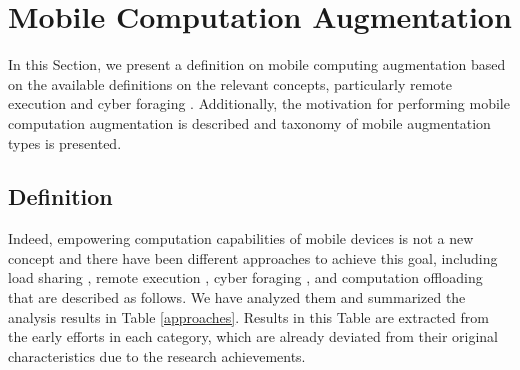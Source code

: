 \documentclass[publish]{IEEEtran}
\begin{document}
\section{Mobile Computation Augmentation} \label{mobileaugmentation}
In this Section, we present a definition on mobile computing augmentation based on the available definitions on the relevant concepts, particularly remote execution \cite{Rudenko1998a} and cyber foraging \cite{Satyanarayanan2001}. Additionally, the motivation for performing mobile computation augmentation is described and taxonomy of mobile augmentation types is presented.

\subsection{Definition} \label{definition}
Indeed, empowering computation capabilities of mobile devices is not a new concept and there have been different approaches to achieve this goal, including load sharing \cite{Othman:1998:PCS:584007.584011}, remote execution \cite{Rudenko1998a}, cyber foraging \cite{Satyanarayanan2001}, and computation offloading \cite{Li2001, Li2002} that are described as follows. {We have analyzed them and summarized the analysis results in Table \ref{approaches}. Results in this Table are extracted from the early efforts in each category, which are already deviated from their original characteristics due to the research achievements.}
\end{document}
